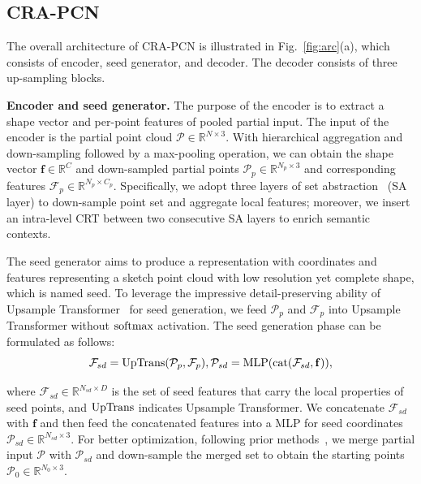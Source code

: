 \documentclass[letterpaper]{article} %
\newcommand{\ve}[1]{\mathbf{#1}} %
\begin{document}
\subsection{CRA-PCN}
The overall architecture of CRA-PCN is illustrated in Fig.~\ref{fig:arc}(a), which consists of encoder, seed generator, and decoder.
The decoder consists of three up-sampling blocks.

{\bf Encoder and seed generator.}
The purpose of the encoder is to extract a shape vector and per-point features of pooled partial input.
The input of the encoder is the partial point cloud $\mathcal{P} \in \mathbb{R}^{N \times 3}$.
With hierarchical aggregation and down-sampling followed by a max-pooling operation, we can obtain the shape vector $\ve{f} \in \mathbb{R}^{C}$ and down-sampled partial points
$\mathcal{P}_p \in \mathbb{R}^{N_p \times 3}$ and corresponding features $\mathcal{F}_p \in \mathbb{R}^{N_p \times C_p}$.
Specifically, we adopt three layers of set abstraction~\cite{qi2017pointnet++} (SA layer) to down-sample point set and aggregate local features; moreover, we insert an intra-level CRT  between two consecutive SA layers to enrich semantic contexts.

The seed generator aims to produce a representation with coordinates and features representing a sketch point cloud with low resolution yet complete shape, which is named seed.
To leverage the impressive detail-preserving ability of Upsample Transformer~\cite{zhou2022seedformer} for seed generation, we feed  $\mathcal{P}_p$ and $\mathcal{F}_p$  into Upsample Transformer without $\rm {softmax} $ activation.
The seed generation phase can be formulated as follows:
\begin{equation}
{\mathcal F}_{sd} = {\mathrm {UpTrans}}({\mathcal P}_p, {\mathcal F}_p), {\mathcal P}_{sd} = {\rm MLP} ({\rm cat}({\mathcal F}_{sd}, {\ve f})),
\end{equation}

{\noindent}where ${\mathcal F}_{sd} \in \mathbb{R}^{N_{sd} \times D}$ is the set of seed features that carry the local properties of seed points, and $\rm UpTrans$ indicates Upsample Transformer.
We concatenate ${\mathcal F}_{sd}$ with $\ve{f}$ and then feed the concatenated features into a MLP for seed coordinates ${\mathcal P}_{sd} \in \mathbb{R}^{N_{sd} \times 3}$.
For better optimization, following prior methods~\cite{xiang2021snowflakenet, wang2020cascaded}, we merge partial input $\mathcal{P}$ with ${\mathcal P}_{sd} $ and down-sample the merged set to obtain the starting points ${\mathcal P}_0\in \mathbb{R}^{N_0\times 3}$.
\end{document}
